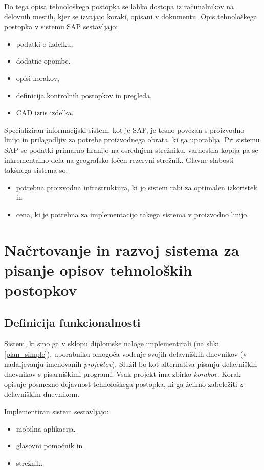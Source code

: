\documentclass[a4paper, 12pt]{book}
\begin{document}
Do tega opisa tehnološkega postopka se lahko dostopa iz računalnikov na delovnih mestih, kjer se izvajajo koraki, opisani v dokumentu.
Opis tehnološkega postopka v sistemu SAP sestavljajo:
\begin{itemize}
	\item podatki o izdelku,
	\item dodatne opombe,
	\item opisi korakov,
	\item definicija kontrolnih postopkov in pregleda, 
	\item CAD izris izdelka.
\end{itemize}

Specializiran informacijski sistem, kot je SAP, je tesno povezan s proizvodno linijo in prilagodljiv za potrebe proizvodnega obrata, ki ga uporablja.
Pri sistemu SAP se podatki primarno hranijo na osrednjem strežniku, varnostna kopija pa se inkrementalno dela na geografsko ločen rezervni strežnik.
Glavne slabosti takšnega sistema so:
\begin{itemize}
	\item potrebna proizvodna infrastruktura, ki jo sistem rabi za optimalen izkoristek in
	\item cena, ki je potrebna za implementacijo takega sistema v proizvodno linijo.
\end{itemize}


\chapter{Načrtovanje in razvoj sistema za pisanje opisov tehnoloških postopkov}

\section{Definicija funkcionalnosti}

Sistem, ki smo ga v sklopu diplomske naloge implementirali (na sliki \ref{plan_simple}), uporabniku omogoča vodenje svojih delavniških dnevnikov (v nadaljevanju imenovanih \textit{projektov}).
Služil bo kot alternativa pisanju delavniških dnevnikov s pisarniškimi programi.
Vsak projekt ima zbirko \textit{korakov}.
Korak opisuje posmezno dejavnost tehnološkega postopka, ki ga želimo zabeležiti z delavniškim dnevnikom.

Implementiran sistem sestavljajo:
\begin{itemize}
	\item mobilna aplikacija,
	\item glasovni pomočnik in
	\item strežnik.
\end{itemize}
\end{document}
